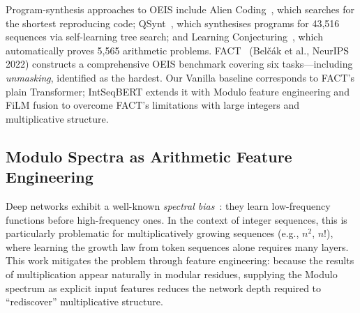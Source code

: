 Program-synthesis approaches to OEIS include Alien Coding~\cite{urban-alien-coding},
which searches for the shortest reproducing code; QSynt~\cite{gauthier2023qsynt}, which
synthesises programs for 43,516 sequences via self-learning tree search; and Learning
Conjecturing~\cite{gauthier2025conjecturing}, which automatically proves 5,565 arithmetic problems.
FACT~\cite{zurich-fact} (Bel\v{c}\'{a}k et al., NeurIPS 2022) constructs a comprehensive OEIS
benchmark covering six tasks---including \emph{unmasking}, identified as the hardest.
Our Vanilla baseline corresponds to FACT's plain Transformer; IntSeqBERT extends it with
Modulo feature engineering and FiLM fusion to overcome FACT's limitations with large integers
and multiplicative structure.

\subsection{Modulo Spectra as Arithmetic Feature Engineering}
\label{sec:background:modulo-engineering}

Deep networks exhibit a well-known \emph{spectral bias}~\cite{rahaman2019spectral}:
they learn low-frequency functions before high-frequency ones. In the context of integer
sequences, this is particularly problematic for multiplicatively growing sequences
(e.g., $n^2$, $n!$), where learning the growth law from token sequences alone requires
many layers.
This work mitigates the problem through feature engineering: because the results of
multiplication appear naturally in modular residues, supplying the Modulo spectrum as explicit
input features reduces the network depth required to ``rediscover'' multiplicative structure.

